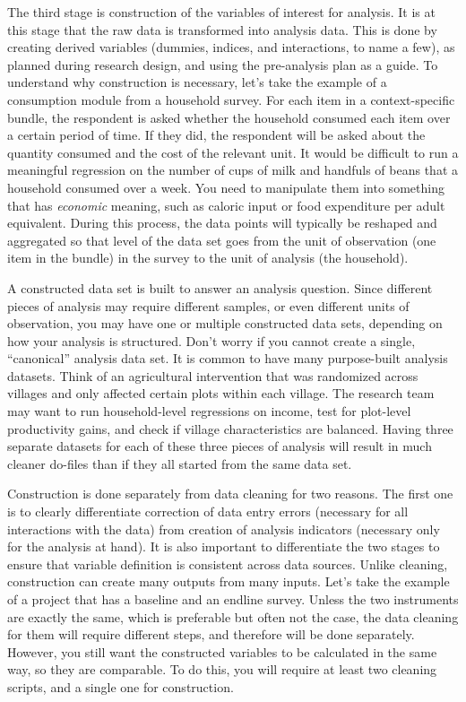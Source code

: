 The third stage is construction of the variables of interest for analysis.
It is at this stage that the raw data is transformed into analysis data.
This is done by creating derived variables (dummies, indices, and interactions, to name a few),
as planned during research design,
and using the pre-analysis plan as a guide.
To understand why construction is necessary,
let's take the example of a consumption module from a household survey.
For each item in a context-specific bundle,
the respondent is asked whether the household consumed each item over a certain period of time.
If they did, the respondent will be asked about the quantity consumed and the cost of the relevant unit.
It would be difficult to run a meaningful regression
on the number of cups of milk and handfuls of beans that a household consumed over a week.
You need to manipulate them into something that has \textit{economic} meaning,
such as caloric input or food expenditure per adult equivalent.
During this process, the data points will typically be reshaped and aggregated
so that level of the data set goes from the unit of observation
(one item in the bundle) in the survey to the unit of analysis (the household).


A constructed data set is built to answer an analysis question.
Since different pieces of analysis may require different samples,
or even different units of observation,
you may have one or multiple constructed data sets,
depending on how your analysis is structured.
Don't worry if you cannot create a single, ``canonical'' analysis data set.
It is common to have many purpose-built analysis datasets.
Think of an agricultural intervention that was randomized across villages
and only affected certain plots within each village.
The research team may want to run household-level regressions on income,
test for plot-level productivity gains,
and check if village characteristics are balanced.
Having three separate datasets for each of these three pieces of analysis
will result in much cleaner do-files than if they all started from the same data set.

Construction is done separately from data cleaning for two reasons.
The first one is to clearly differentiate correction of data entry errors
(necessary for all interactions with the data)
from creation of analysis indicators (necessary only for the analysis at hand).
It is also important to differentiate the two stages
to ensure that variable definition is consistent across data sources.
Unlike cleaning, construction can create many outputs from many inputs.
Let's take the example of a project that has a baseline and an endline survey.
Unless the two instruments are exactly the same,
which is preferable but often not the case,
the data cleaning for them will require different steps,
and therefore will be done separately.
However, you still want the constructed variables to be calculated in the same way, so they are comparable.
To do this, you will require at least two cleaning scripts,
and a single one for construction.

